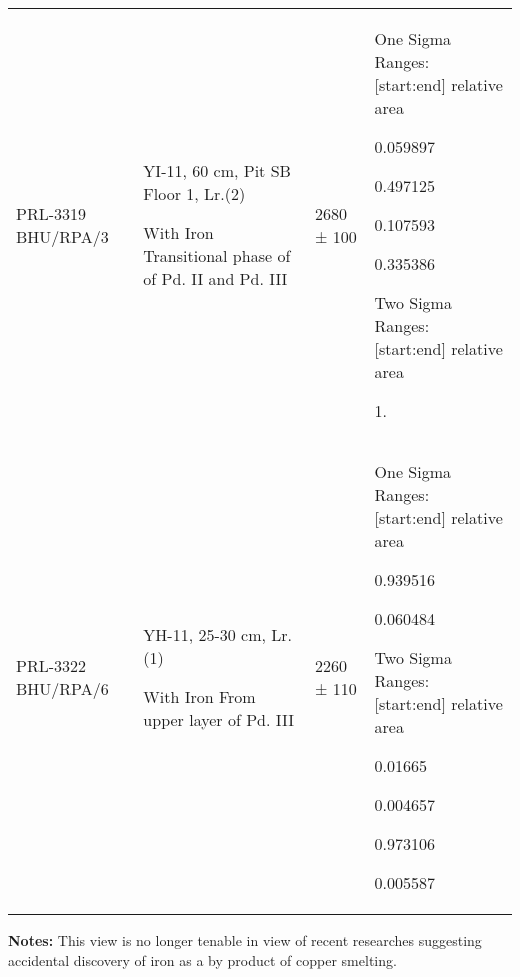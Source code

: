 {{\begin{longtable}{|p{1.3cm}|p{1.6cm}|p{1.6cm}|p{4.4cm}|}
PRL-3319 BHU/RPA/3  & YI-11, 60 cm,  Pit SB Floor 1, Lr.(2) \par With Iron Transitional phase of of Pd. II and Pd. III & 2680 ± 100  & One Sigma Ranges: [start:end] relative area \par  [cal BC 894: cal BC 873] 0.059897\par  [cal BC 849: cal BC 734] 0.497125\par  [cal BC 690: cal BC 662] 0.107593 \par  [cal BC 649: cal BC 546] 0.335386\par Two Sigma Ranges: [start:end] relative area\par  [cal BC 926: cal BC 413] 1.\\
PRL-3322  BHU/RPA/6 & YH-11, 25-30 cm, Lr.(1)\par With Iron From upper layer of Pd. III & 2260 ± 110 & One Sigma Ranges: [start:end] relative area \par [cal BC 387: cal BC 159] 0.939516 \par [cal BC 134: cal BC 116] 0.060484 \par Two Sigma Ranges: [start:end] relative area \par [cal BC 507: cal BC 459] 0.01665 \par [cal BC 453: cal BC 439] 0.004657 \par [cal BC 419: cal AD 31] 0.973106 \par [cal AD 37: cal AD 52] 0.005587
\end{longtable}
\textbf{Notes:} This view is no longer tenable in view of recent researches suggesting accidental discovery of iron as a by product of copper smelting.
}}
